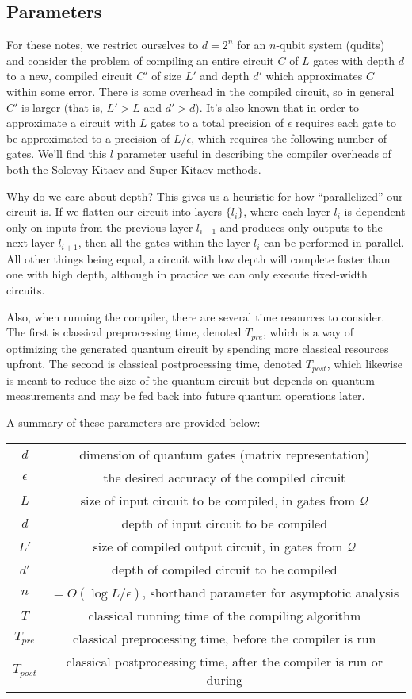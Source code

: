 \documentclass{article}
\theoremstyle{plain}
\begin{document}
\subsection{Parameters}

For these notes, we restrict ourselves to $d=2^n$ for an $n$-qubit system (qudits)
and consider the problem of compiling an entire circuit $C$ of $L$ gates with depth
$d$ to a new, compiled circuit $C'$ of size $L'$ and depth $d'$ which approximates
$C$ within some error. There is some overhead in the compiled circuit, so in
general $C'$ is larger (that is, $L' > L$ and $d' > d$). It's also known that
in order to approximate a circuit with $L$ gates to a total precision of $\epsilon$
requires each gate to be approximated to a precision of $L/\epsilon$, which requires
the following number of gates. We'll find this $l$ parameter useful in describing the compiler overheads of
both the Solovay-Kitaev and Super-Kitaev methods.

Why do we care about depth? This gives us a heuristic for how ``parallelized'' our
circuit is. If we flatten our circuit into layers $\{l_i\}$, where each layer $l_i$
is dependent only on inputs from the previous layer $l_{i-1}$ and produces
only outputs to the next layer $l_{i+1}$, then all the gates within the layer
$l_i$ can be performed in parallel. All other things being equal, a circuit with low depth will complete
faster than one with high depth, although in practice we can only execute
fixed-width circuits.

Also, when running the compiler, there are several time resources to consider.
The first is classical preprocessing time, denoted $T_{pre}$, which is a way of optimizing
the generated quantum circuit by spending more classical resources upfront.
The second is classical postprocessing time, denoted $T_{post}$, which likewise
is meant to reduce the size of the quantum circuit but depends on quantum
measurements and may be fed back into future quantum operations later.

A summary of these parameters are provided below:

\begin{tabular}{|c|c|}
\hline
$d$ & dimension of quantum gates (matrix representation)\\
$\epsilon$ & the desired accuracy of the compiled circuit\\
$L$ & size of input circuit to be compiled, in gates from $\mathcal{Q}$\\
$d$ & depth of input circuit to be compiled\\
$L'$ & size of compiled output circuit, in gates from $\mathcal{Q}$\\
$d'$ & depth of compiled circuit to be compiled\\
$n$ & $=O(\log{L/\epsilon})$, shorthand parameter for asymptotic analysis\\
$T$ & classical running time of the compiling algorithm\\
$T_{pre}$ & classical preprocessing time, before the compiler is run\\
$T_{post}$ & classical postprocessing time, after the compiler is run or during\\
\hline
\end{tabular}
\end{document}
